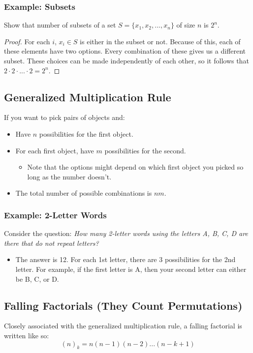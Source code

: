 \documentclass[letterpaper]{article}
\begin{document}
\subsubsection{Example: Subsets}
Show that number of subsets of a set $S = \{x_1, x_2, ..., x_n\}$ of size $n$ is $2^n$. 

\begin{proof}
    For each $i$, $x_i \in S$ is either in the subset or not. Because of this, each of these elements have two options. Every combination of these gives us a different subset. These choices can be made independently of each other, so it follows that $2 \cdot 2 \cdot ... \cdot 2 = 2^n$. 
\end{proof}

\subsection{Generalized Multiplication Rule}
If you want to pick pairs of objects and:
\begin{itemize}
    \item Have $n$ possibilities for the first object.
    \item For each first object, have $m$ possibilities for the second. 
    \begin{itemize}
        \item Note that the options might depend on which first object you picked so long as the number doesn't. 
    \end{itemize}

    \item The total number of possible combinations is $nm$.  
\end{itemize}

\subsubsection{Example: 2-Letter Words}
Consider the question: \emph{How many 2-letter words using the letters A, B, C, D are there that do not repeat letters?} 

\begin{itemize}
    \item The answer is 12. For each 1st letter, there are 3 possibilities for the 2nd letter. For example, if the first letter is A, then your second letter can either be B, C, or D.
\end{itemize}

\subsection{Falling Factorials (They Count Permutations)}
Closely associated with the generalized multiplication rule, a falling factorial is written like so:
\[(n)_k = n(n - 1)(n - 2)...(n - k + 1)\]
\end{document}
